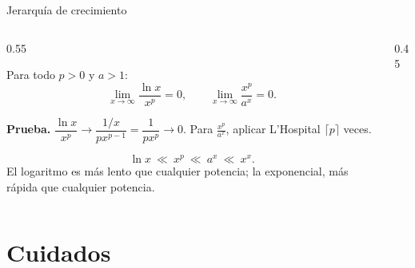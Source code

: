 \documentclass[10pt,aspectratio=169]{beamer}
\begin{document}
\begin{frame}{Jerarquía de crecimiento}
  \begin{columns}
    \begin{column}{0.55\textwidth}
      \begin{teorema}
        Para todo $p>0$ y $a>1$:
        \[ \lim_{x\to\infty}\frac{\ln x}{x^p}=0,\qquad\lim_{x\to\infty}\frac{x^p}{a^x}=0. \]
      \end{teorema}
      \textbf{Prueba.} $\dfrac{\ln x}{x^p}\to\dfrac{1/x}{px^{p-1}}=\dfrac1{px^p}\to0$. Para $\frac{x^p}{a^x}$, aplicar L'Hospital $\lceil p\rceil$ veces.
      \begin{idea}
        \[ \ln x\ \ll\ x^p\ \ll\ a^x\ \ll\ x^x. \]
        El logaritmo es más lento que cualquier potencia; la exponencial, más rápida que cualquier potencia.
      \end{idea}
    \end{column}
    \begin{column}{0.45\textwidth}
      \centering
    \end{column}
  \end{columns}
\end{frame}

\section{Cuidados}
\end{document}
